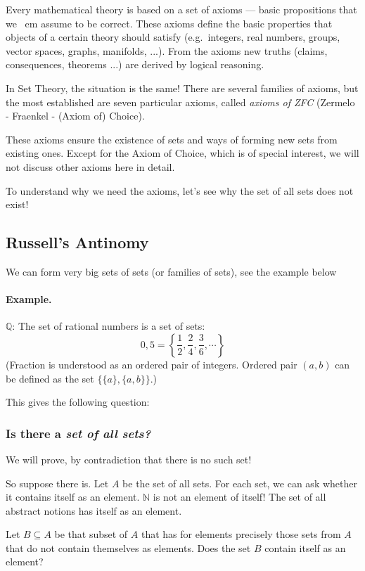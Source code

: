 \documentclass[11pt,paper=b5,footinclude,headinclude]{scrbook} %
\theoremstyle{remark}
\theoremstyle{definition} %
\begin{document}
Every mathematical theory is based on a set of axioms --- basic propositions that we {\ em assume} to be correct.
These axioms define the basic properties that objects of a certain theory should satisfy (e.g.~integers, real numbers, groups, vector spaces, graphs, manifolds, ...). From the axioms new truths (claims, consequences, theorems ...) are derived by logical reasoning.

In Set Theory, the situation is the same! There are several families of axioms, but the most established are seven particular axioms, called {\em axioms of ZFC} (Zermelo - Fraenkel - (Axiom of) Choice).

These axioms ensure the existence of sets and ways of forming new sets from existing ones.
Except for the Axiom of Choice, which is of special interest, we will not discuss other axioms here in detail.

To understand why we need the axioms, let's see why the set of all sets does not exist!

\subsection*{Russell's Antinomy}

We can form very big sets of sets (or families of sets), see the example below

\paragraph{Example.}  $\mathbb{Q}$: The set of rational numbers is a set of sets:
$$0,5 = \left\{\frac{1}{2}, \frac{2}{4}, \frac{3}{6}, \cdots\right\}$$
(Fraction is understood as an ordered pair of integers. Ordered pair $ (a, b) $ can be defined as the set $\{\{a \}, \{a, b \} \} $.)

This gives the following question:
\subsubsection*{Is there a {\em set of all sets?}}

We will prove, by contradiction that there is no such set!

So suppose there is. Let $ A $ be the set of all sets.
For each set, we can ask whether it contains itself as an element. $\mathbb{N} $ is not an element of itself!
The set of all abstract notions has itself as an element.

Let $B \subseteq A $ be that subset of $A$ that has for elements precisely those sets from $A$ that do not contain themselves as elements.
Does the set $B$ contain itself as an element?
\end{document}
